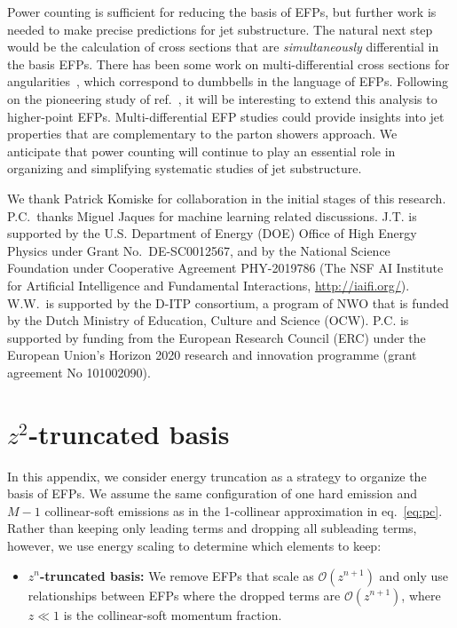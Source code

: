 \documentclass[a4paper,11pt]{article}
\newcommand{\eq}[1]{eq.~\eqref{eq:#1}}
\newcommand{\refcite}[1]{ref.~\cite{#1}}
\begin{document}
Power counting is sufficient for reducing the basis of EFPs, but further work is needed to make precise predictions for jet substructure.
%
The natural next step would be the calculation of cross sections that are \emph{simultaneously} differential in the basis EFPs.
%
There has been some work on multi-differential cross sections for angularities~\cite{Larkoski:2014tva,Procura:2014cba,Procura:2018zpn,Lustermans:2019gxu}, which correspond to dumbbells in the language of EFPs.
%
Following on the pioneering study of \refcite{Larkoski:2015kga}, it will be interesting to extend this analysis to higher-point EFPs.
%
Multi-differential EFP studies could provide insights into jet properties that are complementary to the parton showers approach.
%
We anticipate that power counting will continue to play an essential role in organizing and simplifying systematic studies of jet substructure.


\begin{acknowledgments}
%
We thank Patrick Komiske for collaboration in the initial stages of this research.
%
P.C.~thanks Miguel Jaques for machine learning related discussions. 
%
J.T. is supported by the U.S. Department of Energy (DOE) Office of High Energy Physics under Grant No.\ DE-SC0012567, and by the National Science Foundation under Cooperative Agreement PHY-2019786 (The NSF AI Institute for Artificial Intelligence and Fundamental Interactions, \url{http://iaifi.org/}).
%
W.W.~is supported by the D-ITP consortium, a program of NWO that is funded by the Dutch Ministry of Education, Culture and Science (OCW).
%
P.C. is supported by funding from the European Research Council (ERC) under the European Union’s
Horizon 2020 research and innovation programme (grant agreement No 101002090).



\end{acknowledgments}

\appendix

\section{$z^2$-truncated basis}
\label{app:energy-expansion}


In this appendix, we consider energy truncation as a strategy to organize the basis of EFPs.
%
We assume the same configuration of one hard emission and $M-1$ collinear-soft emissions as in the 1-collinear approximation in \eq{pc}.
%
Rather than keeping only leading terms and dropping all subleading terms, however, we use energy scaling to determine which elements to keep:
%
\begin{itemize}
\item \textbf{$z^n$-truncated basis:} We remove EFPs that scale as $\mathcal{O}(z^{n+1})$ and only use relationships between EFPs where the dropped terms are $\mathcal{O}(z^{n+1})$, where $z\ll 1$ is the collinear-soft momentum fraction.
\end{itemize}
\end{document}
